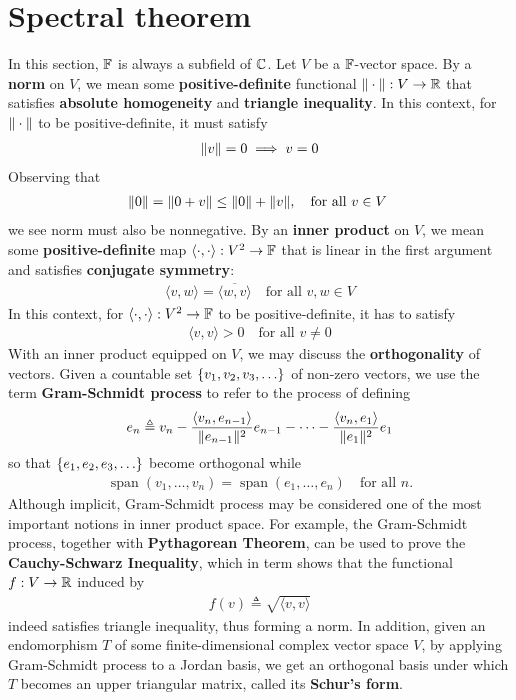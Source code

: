 \documentclass{report}
\begin{document}
\section{Spectral theorem}
\label{Spectral Theorem}
In this section, $\mathbb{F}$ is always a subfield of  $\mathbb{C}$. Let  $V$ be a $\mathbb{F}$-vector space. By a \textbf{norm} on $V$, we mean some \textbf{positive-definite} functional $\| \cdot \|:V\to \mathbb{R}$ that satisfies \textbf{absolute homogeneity} and \textbf{triangle inequality}. In this context, for $\| \cdot \|$ to be positive-definite, it must satisfy 
\begin{align*}
  \| v \|=0 \implies  v=0
\end{align*}
Observing that  
\begin{align*}
\| 0 \|=\| 0+v \|\leq \| 0 \|+\| v \|,\quad \text{for all $v\in V$ }
\end{align*}
we see norm must also be nonnegative. By an \textbf{inner product} on $V$, we mean some \textbf{positive-definite}  map $\langle \cdot,\cdot\rangle : V^2 \rightarrow \mathbb{F}$ that is linear in the first argument and satisfies \textbf{conjugate symmetry}: 
\begin{align*}
\langle v,w\rangle = \overline{\langle w,v\rangle }\quad\text{for all }v,w \in V
\end{align*}
In this context, for $\langle \cdot,\cdot\rangle :V^2\rightarrow \mathbb{F}$ to be positive-definite, it has to satisfy 
\begin{align*}
\langle v,v\rangle >0\quad\text{for all }v\neq 0
\end{align*}
With an inner product equipped on $V$, we may discuss the  \textbf{orthogonality} of vectors. Given a countable set  $\set{v_1,v_2,v_3,\dots }$ of non-zero vectors, we use the term \textbf{Gram-Schmidt process} to refer to the process of defining 
\begin{align*}
e_n \triangleq v_n - \frac{\langle v_{n},e_{n-1}\rangle }{\| e_{n-1} \|^2}e_{n-1} - \cdots - \frac{\langle v_n,e_1\rangle }{\| e_1 \|^2}e_1
\end{align*}
so that $\set{e_1,e_2,e_3,\dots}$ become orthogonal while 
\begin{align*}
\operatorname{span}(v_1,\dots ,v_n)=\operatorname{span}(e_1,\dots ,e_n)\quad\text{for all }n.
\end{align*}
Although implicit, Gram-Schmidt process may be considered one of the most important notions in inner product space. For example, the Gram-Schmidt process, together with \textbf{Pythagorean Theorem}, can be used to prove the \textbf{Cauchy-Schwarz Inequality}, which in term shows that the functional $f:V\rightarrow \mathbb{R}$ induced by 
\begin{align*}
f(v)\triangleq \sqrt{\langle v,v\rangle }  
\end{align*}
indeed satisfies triangle inequality, thus forming a norm. In addition, given an endomorphism $T$ of some finite-dimensional complex vector space $V$, by applying Gram-Schmidt process to a Jordan basis, we get an orthogonal basis under which $T$ becomes an upper triangular matrix, called its \textbf{Schur's form}.\\
\end{document}
